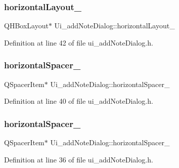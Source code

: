 \hypertarget{classUi__addNoteDialog_a887453602e2364b3972cf6b0512210c9}{}\label{classUi__addNoteDialog_a887453602e2364b3972cf6b0512210c9} 
\subsubsection{\texorpdfstring{horizontal\+Layout\+\_}{horizontalLayout\_5}}
{\footnotesize\ttfamily Q\+H\+Box\+Layout$\ast$ Ui\+\_\+add\+Note\+Dialog\+::horizontal\+Layout\+\_}



Definition at line 42 of file ui\+\_\+add\+Note\+Dialog.\+h.

\hypertarget{classUi__addNoteDialog_a5c9351b134e471dcf8256461f2e5edb3}{}\label{classUi__addNoteDialog_a5c9351b134e471dcf8256461f2e5edb3} 
\subsubsection{\texorpdfstring{horizontal\+Spacer\+\_}{horizontalSpacer\_2}}
{\footnotesize\ttfamily Q\+Spacer\+Item$\ast$ Ui\+\_\+add\+Note\+Dialog\+::horizontal\+Spacer\+\_}



Definition at line 40 of file ui\+\_\+add\+Note\+Dialog.\+h.

\hypertarget{classUi__addNoteDialog_a790839063730f8529b1ee5c38bcea903}{}\label{classUi__addNoteDialog_a790839063730f8529b1ee5c38bcea903} 
\subsubsection{\texorpdfstring{horizontal\+Spacer\+\_}{horizontalSpacer\_5}}
{\footnotesize\ttfamily Q\+Spacer\+Item$\ast$ Ui\+\_\+add\+Note\+Dialog\+::horizontal\+Spacer\+\_}



Definition at line 36 of file ui\+\_\+add\+Note\+Dialog.\+h.

